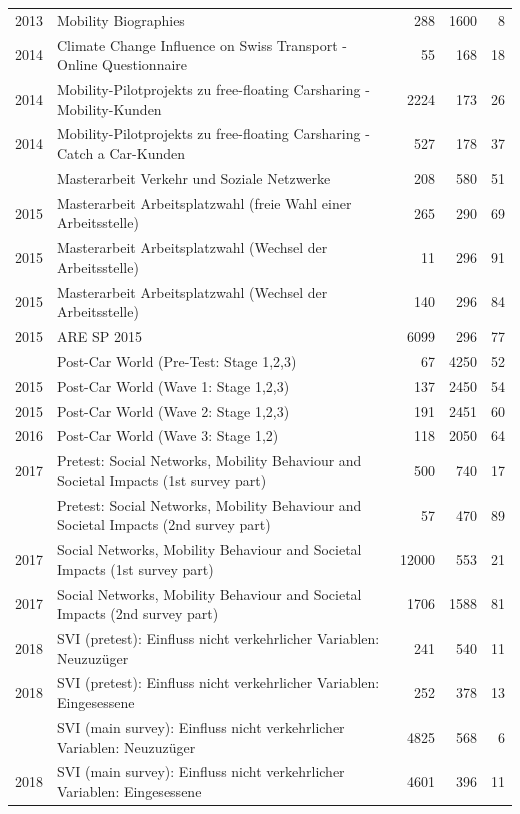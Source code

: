 \documentclass[a4paper]{article}\usepackage[]{graphicx}\usepackage[]{xcolor}
\begin{document}
\begin{landscape}
\begin{longtable}[t]{rlrrr}
2013 & Mobility Biographies & 288 & 1600 & 8\\
2014 & Climate Change Influence on Swiss Transport - Online Questionnaire & 55 & 168 & 18\\
2014 & Mobility-Pilotprojekts zu free-floating Carsharing - Mobility-Kunden & 2224 & 173 & 26\\
2014 & Mobility-Pilotprojekts zu free-floating Carsharing - Catch a Car-Kunden & 527 & 178 & 37\\
\addlinespace
2014 & Masterarbeit Verkehr und Soziale Netzwerke & 208 & 580 & 51\\
2015 & Masterarbeit Arbeitsplatzwahl (freie Wahl einer Arbeitsstelle) & 265 & 290 & 69\\
2015 & Masterarbeit Arbeitsplatzwahl (Wechsel der Arbeitsstelle) & 11 & 296 & 91\\
2015 & Masterarbeit Arbeitsplatzwahl (Wechsel der Arbeitsstelle) & 140 & 296 & 84\\
2015 & ARE SP 2015 & 6099 & 296 & 77\\
\addlinespace
2015 & Post-Car World (Pre-Test: Stage 1,2,3) & 67 & 4250 & 52\\
2015 & Post-Car World (Wave 1: Stage 1,2,3) & 137 & 2450 & 54\\
2015 & Post-Car World (Wave 2: Stage 1,2,3) & 191 & 2451 & 60\\
2016 & Post-Car World (Wave 3: Stage 1,2) & 118 & 2050 & 64\\
2017 & Pretest: Social Networks, Mobility Behaviour and Societal Impacts (1st survey part) & 500 & 740 & 17\\
\addlinespace
2017 & Pretest: Social Networks, Mobility Behaviour and Societal Impacts (2nd survey part) & 57 & 470 & 89\\
2017 & Social Networks, Mobility Behaviour and Societal Impacts (1st survey part) & 12000 & 553 & 21\\
2017 & Social Networks, Mobility Behaviour and Societal Impacts (2nd survey part) & 1706 & 1588 & 81\\
2018 & SVI (pretest): Einfluss nicht verkehrlicher Variablen: Neuzuzüger & 241 & 540 & 11\\
2018 & SVI (pretest): Einfluss nicht verkehrlicher Variablen: Eingesessene & 252 & 378 & 13\\
\addlinespace
2018 & SVI (main survey):  Einfluss nicht verkehrlicher Variablen: Neuzuzüger & 4825 & 568 & 6\\
2018 & SVI (main survey): Einfluss nicht verkehrlicher Variablen: Eingesessene & 4601 & 396 & 11\\

\end{longtable}
\end{landscape}
\end{document}
